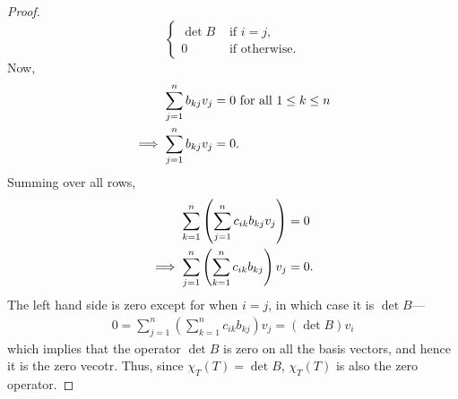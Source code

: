 \documentclass[15pt,a4paper]{book}
\theoremstyle{definition}
\begin{document}
\begin{proof}
\begin{equation*}
\begin{cases}
            \det{B} &\text{ if } i = j,\\
            0 &\text{ if otherwise}.
        \end{cases}
    \end{equation*}
    Now,
    \begin{align}
        \sum_{j=1}^{n} b_{kj} v_{j} &= 0 \text{ for all } 1 \leq k \leq n \notag \\
        \implies \sum_{j=1}^{n} b_{kj} v_{j} &= 0 \notag.
    \end{align}
    Summing over all rows,
    \begin{align}
        \sum_{k=1}^{n} \left( \sum_{j=1}^{n} c_{ik} b_{kj} v_{j} \right) &= 0 \notag \\
        \implies \sum_{j=1}^{n} \left( \sum_{k=1}^{n} c_{ik} b_{kj} \right) v_{j} &= 0.
    \end{align}
    The left hand side is zero except for when $i = j$, in which case it is $\det{B}$---
    \begin{align}
        0 = \sum_{j=1}^{n} \left( \sum_{k=1}^{n} c_{ik} b_{kj} \right) v_{j} = (\det{B})v_{i}
    \end{align}
    which implies that the operator $\det{B}$ is zero on all the basis vectors, and hence it is the zero vecotr. Thus, since $\chi_{T}(T) = \det{B}$, $\chi_{T}(T)$ is also the zero operator.
\end{proof}
\end{document}
